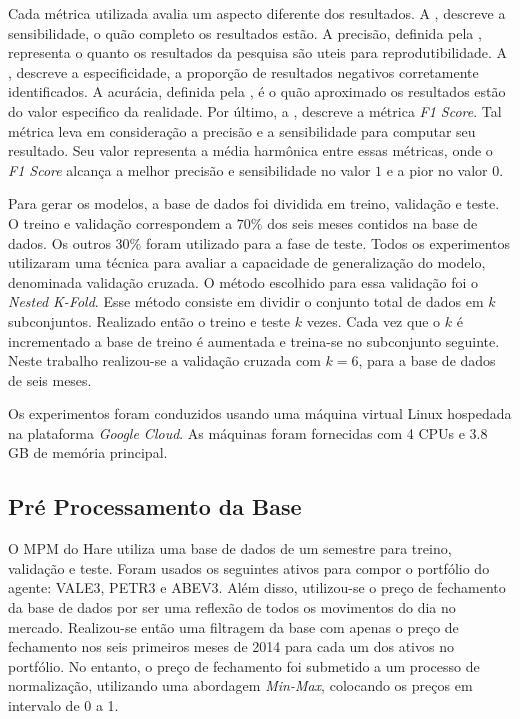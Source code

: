 

Cada métrica utilizada avalia um aspecto diferente dos resultados. A , descreve a sensibilidade, o quão completo os resultados estão. A precisão, definida pela , representa o quanto os resultados da pesquisa são uteis para reprodutibilidade. A , descreve a especificidade, a proporção de resultados negativos corretamente identificados. A acurácia, definida pela , é o quão aproximado os resultados estão do valor especifico da realidade. Por último, a , descreve a métrica \textit{F1 Score}. Tal métrica leva em consideração a precisão e a sensibilidade para computar seu resultado. Seu valor representa a média harmônica entre essas métricas, onde o \textit{F1 Score} alcança a melhor precisão e sensibilidade no valor $1$ e a pior no valor $0$.

Para gerar os modelos, a base de dados foi dividida em treino, validação e teste. O treino e validação correspondem a $70\%$ dos seis meses contidos na base de dados. Os outros $30\%$ foram utilizado para a fase de teste. Todos os experimentos utilizaram uma técnica para avaliar a capacidade de generalização do modelo, denominada validação cruzada. O método escolhido para essa validação foi o \emph{Nested K-Fold}. Esse método consiste em dividir o conjunto total de dados em $k$ subconjuntos. Realizado então o treino e teste $k$ vezes. Cada vez que o $k$ é incrementado a base de treino é aumentada e treina-se no subconjunto seguinte. Neste trabalho realizou-se a validação cruzada com $k=6$, para a base de dados de seis meses.

Os experimentos foram conduzidos usando uma máquina virtual Linux hospedada na plataforma \textit{Google Cloud}. As máquinas foram fornecidas com 4 CPUs e 3.8 GB de memória principal.

\subsection{Pré Processamento da Base}

O \acrshort{MPM} do Hare utiliza uma base de dados de um semestre para treino, validação e teste. Foram usados os seguintes ativos para compor o portfólio do agente: VALE3, PETR3 e ABEV3. Além disso, utilizou-se o preço de fechamento da base de dados por ser uma reflexão de todos os movimentos do dia no mercado. Realizou-se então uma filtragem da base com apenas o preço de fechamento nos seis primeiros meses de 2014 para cada um dos ativos no portfólio. No entanto, o preço de fechamento foi submetido a um processo de normalização, utilizando uma abordagem \textit{Min-Max}, colocando os preços em intervalo de 0 a 1. 

